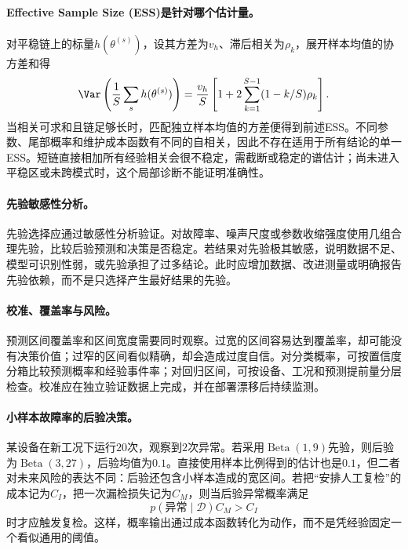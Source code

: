 \paragraph{Effective Sample Size (ESS)是针对哪个估计量。}
对平稳链上的标量$h(\theta^{(s)})$，设其方差为$v_h$、滞后相关为$\rho_k$，展开样本均值的协方差和得
\begin{equation}
 \Var\left(\frac1S\sum_sh(\theta^{(s)})\right)
 =\frac{v_h}{S}\left[1+2\sum_{k=1}^{S-1}(1-k/S)\rho_k\right].
\end{equation}
当相关可求和且链足够长时，匹配独立样本均值的方差便得到前述ESS。不同参数、尾部概率和维护成本函数有不同的自相关，因此不存在适用于所有结论的单一ESS。短链直接相加所有经验相关会很不稳定，需截断或稳定的谱估计；尚未进入平稳区或未跨模式时，这个局部诊断不能证明准确性。

\paragraph{先验敏感性分析。}
先验选择应通过敏感性分析验证。对故障率、噪声尺度或参数收缩强度使用几组合理先验，比较后验预测和决策是否稳定。若结果对先验极其敏感，说明数据不足、模型可识别性弱，或先验承担了过多结论。此时应增加数据、改进测量或明确报告先验依赖，而不是只选择产生最好结果的先验。

\paragraph{校准、覆盖率与风险。}
预测区间覆盖率和区间宽度需要同时观察。过宽的区间容易达到覆盖率，却可能没有决策价值；过窄的区间看似精确，却会造成过度自信。对分类概率，可按置信度分箱比较预测概率和经验事件率；对回归区间，可按设备、工况和预测提前量分层检查。校准应在独立验证数据上完成，并在部署漂移后持续监测。

\paragraph{小样本故障率的后验决策。}
某设备在新工况下运行$20$次，观察到$2$次异常。若采用$\operatorname{Beta}(1,9)$先验，则后验为$\operatorname{Beta}(3,27)$，后验均值为$0.1$。直接使用样本比例得到的估计也是$0.1$，但二者对未来风险的表达不同：后验还包含小样本造成的宽区间。若把“安排人工复检”的成本记为$C_I$，把一次漏检损失记为$C_M$，则当后验异常概率满足
\begin{equation}
 p(\text{异常}\mid\mathcal D)C_M>C_I
\end{equation}
时才应触发复检。这样，概率输出通过成本函数转化为动作，而不是凭经验固定一个看似通用的阈值。


